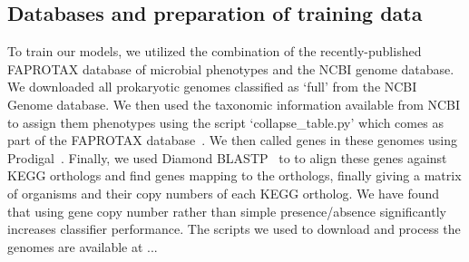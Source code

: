 \documentclass[10pt,letterpaper]{article}
\begin{document}
\subsection*{Databases and preparation of training data}
To train our models, we utilized the combination of the recently-published FAPROTAX database of microbial phenotypes and the NCBI genome database. We downloaded all prokaryotic genomes classified as `full' from the NCBI Genome database. We then used the taxonomic information available from NCBI to assign them phenotypes using the script `collapse\_table.py' which comes as part of the FAPROTAX database~\cite{Louca2016}. We then called genes in these genomes using Prodigal~\cite{Hyatt2010}. Finally, we used Diamond BLASTP~\cite{Buchfink2014} to to align these genes against KEGG orthologs and find genes mapping to the orthologs, finally giving a matrix of organisms and their copy numbers of each KEGG ortholog. We have found that using gene copy number rather than simple presence/absence significantly increases classifier performance. The scripts we used to download and process the genomes are available at ...
\end{document}
